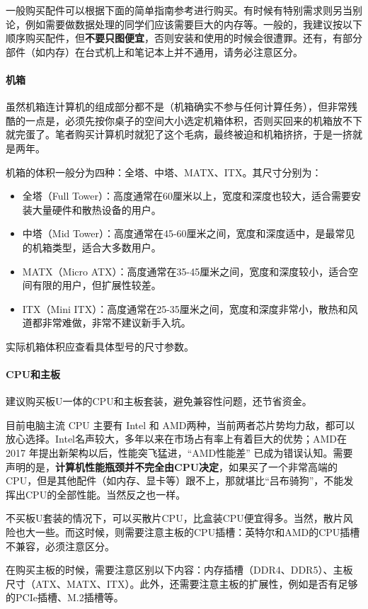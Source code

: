 一般购买配件可以根据下面的简单指南参考进行购买。有时候有特别需求则另当别论，例如需要做数据处理的同学们应该需要巨大的内存等。一般的，我建议按以下顺序购买配件，但\textbf{不要只图便宜}，否则安装和使用的时候会很遭罪。还有，有部分部件（如内存）在台式机上和笔记本上并不通用，请务必注意区分。

\paragraph{机箱}

虽然机箱连计算机的组成部分都不是（机箱确实不参与任何计算任务），但非常残酷的一点是，必须先按你桌子的空间大小选定机箱体积，否则买回来的机箱放不下就完蛋了。笔者购买计算机时就犯了这个毛病，最终被迫和机箱挤挤，于是一挤就是两年。

机箱的体积一般分为四种：全塔、中塔、MATX、ITX。其尺寸分别为：
\begin{itemize}
  \item 全塔（Full Tower）：高度通常在60厘米以上，宽度和深度也较大，适合需要安装大量硬件和散热设备的用户。
  \item 中塔（Mid Tower）：高度通常在45-60厘米之间，宽度和深度适中，是最常见的机箱类型，适合大多数用户。
  \item MATX（Micro ATX）：高度通常在35-45厘米之间，宽度和深度较小，适合空间有限的用户，但扩展性较差。
  \item ITX（Mini ITX）：高度通常在25-35厘米之间，宽度和深度非常小，散热和风道都非常难做，非常不建议新手入坑。
\end{itemize}
实际机箱体积应查看具体型号的尺寸参数。

\paragraph{CPU和主板}

建议购买板U一体的CPU和主板套装，避免兼容性问题，还节省资金。

目前电脑主流 CPU 主要有 Intel 和 AMD两种，当前两者芯片势均力敌，都可以放心选择。Intel名声较大，多年以来在市场占有率上有着巨大的优势；AMD在2017 年提出新架构以后，性能突飞猛进，“AMD性能差” 已成为错误认知。需要声明的是，\textbf{计算机性能瓶颈并不完全由CPU决定}，如果买了一个非常高端的CPU，但是其他配件（如内存、显卡等）跟不上，那就堪比“吕布骑狗”，不能发挥出CPU的全部性能。当然反之也一样。

不买板U套装的情况下，可以买散片CPU，比盒装CPU便宜得多。当然，散片风险也大一些。而这时候，则需要注意主板的CPU插槽：英特尔和AMD的CPU插槽不兼容，必须注意区分。

在购买主板的时候，需要注意区别以下内容：内存插槽（DDR4、DDR5）、主板尺寸（ATX、MATX、ITX）。此外，还需要注意主板的扩展性，例如是否有足够的PCIe插槽、M.2插槽等。

